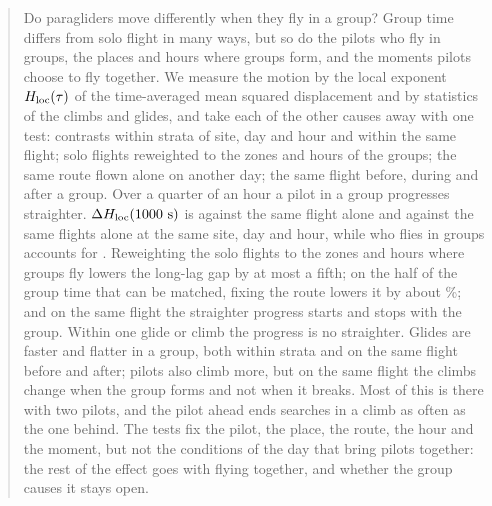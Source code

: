 \begin{abstract}
\noindent
Do paragliders move differently when they fly in a group? Group time differs from solo flight in
many ways, but so do the pilots who fly in groups, the places and hours where groups form, and the
moments pilots choose to fly together. We measure the motion by the local exponent $\Hloc(\tau)$ of
the time-averaged mean squared displacement and by statistics of the climbs and glides, and take
each of the other causes away with one test: contrasts within strata of site, day and hour and
within the same flight; solo flights reweighted to the zones and hours of the groups; the same route
flown alone on another day; the same flight before, during and after a group. Over a quarter of an hour a pilot in a group progresses
straighter. $\Delta\Hloc(1000~\mathrm{s})$ is \DHlocThousandFlight{} against the same flight alone and
\DHlocThousandGroupSdh{} against the same flights alone at the same site, day and hour, while who
flies in groups accounts for \DHlocThousandSel. Reweighting the solo flights to the zones and hours
where groups fly lowers the long-lag gap by at most a fifth; on the half of the group time that can
be matched, fixing the route lowers it by about \RouteExplained\%; and on the same flight the
straighter progress starts and stops with the group. Within one glide or climb the progress is no straighter. Glides are faster and flatter
in a group, both within strata and on the same flight before and after; pilots also climb more, but on the same flight the climbs change when the
group forms and not when it breaks. Most of this is there with two pilots, and the pilot ahead ends
searches in a climb as often as the one behind. The tests fix the pilot, the place, the route, the
hour and the moment, but not the conditions of the day that bring pilots together: the rest of the
effect goes with flying together, and whether the group causes it stays open.
\end{abstract}
